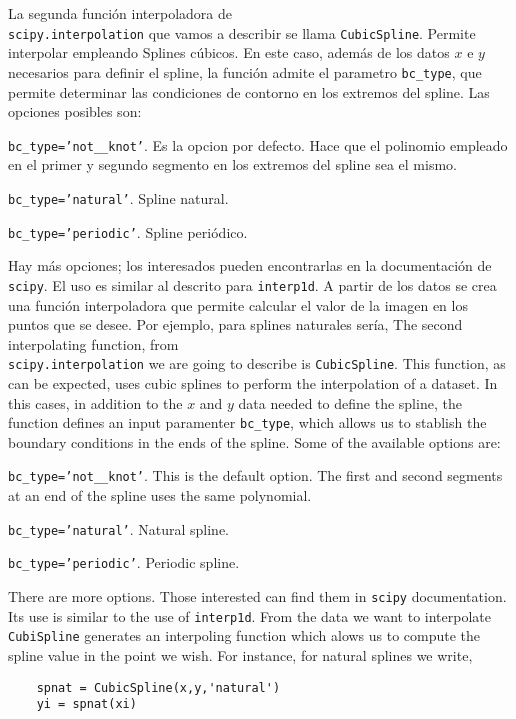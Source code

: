 \begin{paracol}{2}
La segunda función interpoladora de\\ \texttt{scipy.interpolation} que vamos a describir se llama \texttt{CubicSpline}. Permite interpolar empleando Splines cúbicos. En este caso, además de los datos $x$ e $y$ necesarios para definir el spline, la función admite el parametro \texttt{bc_type}, que permite determinar las condiciones de contorno en los extremos del spline. Las opciones posibles son: 

\texttt{bc_type='not__knot'}. Es la opcion por defecto. Hace que el polinomio empleado en el primer y segundo segmento en los extremos del spline sea el mismo.
 
\texttt{bc_type='natural'}. Spline natural.

\texttt{bc_type='periodic'}. Spline periódico.

Hay más opciones; los interesados pueden encontrarlas en la documentación de \texttt{scipy}. El uso es similar al descrito para \texttt{interp1d}. A partir de los datos se crea una función interpoladora que permite calcular el valor de la imagen en los puntos que se desee. Por ejemplo, para splines naturales sería,
\switchcolumn
 The second interpolating function, from\\ \texttt{scipy.interpolation} we are going to describe is \texttt{CubicSpline}. This function, as can be expected, uses cubic splines to perform the interpolation of a dataset. In this cases, in addition to the $x$ and $y$ data needed to define the spline, the function defines an input paramenter \texttt{bc_type}, which allows us to stablish the boundary conditions in the ends of the spline. Some of the available options are:
 
\texttt{bc_type='not__knot'}. This is the default option. The first and second segments at an end of the spline uses the same polynomial.

\texttt{bc_type='natural'}. Natural spline.

\texttt{bc_type='periodic'}. Periodic spline.

There are more options. Those interested can find them in \texttt{scipy} documentation. Its use  is similar to the use of \texttt{interp1d}. From the data we want to interpolate \texttt{CubiSpline} generates an interpoling function which alows us to compute the spline value in the point we wish. For instance, for natural splines we write, 
 
  
\end{paracol}
\begin{center}
\begin{minipage}{.5\textwidth}
\begin{verbatim}
	spnat = CubicSpline(x,y,'natural')
	yi = spnat(xi)
\end{verbatim}
\end{minipage}
\end{center}

